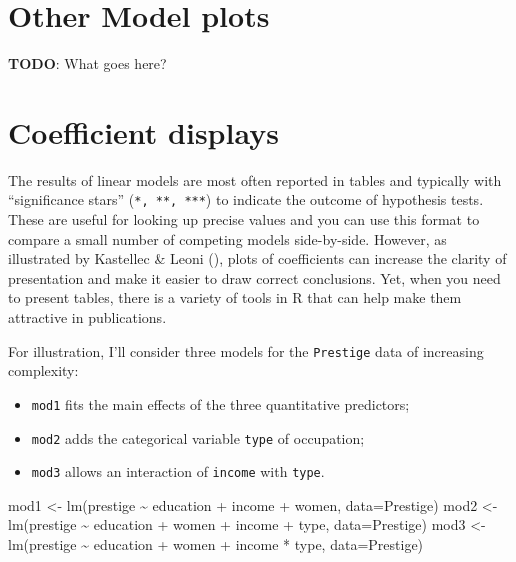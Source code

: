 \documentclass[
  letterpaper,
  10pt,
  krantz2]{krantz}
\makeatletter
\newenvironment{Shaded}{\begin{snugshade}}{\end{snugshade}}
\newcommand{\AttributeTok}[1]{\textcolor[rgb]{0.40,0.45,0.13}{#1}}
\newcommand{\FunctionTok}[1]{\textcolor[rgb]{0.28,0.35,0.67}{#1}}
\newcommand{\NormalTok}[1]{\textcolor[rgb]{0.00,0.23,0.31}{#1}}
\newcommand{\OtherTok}[1]{\textcolor[rgb]{0.00,0.23,0.31}{#1}}
\newcommand{\SpecialCharTok}[1]{\textcolor[rgb]{0.37,0.37,0.37}{#1}}
\providecommand{\tightlist}{%
  \setlength{\itemsep}{0pt}\setlength{\parskip}{0pt}}\usepackage{longtable,booktabs,array}
\newenvironment{kframe}{%
  \medskip{}
  \setlength{\fboxsep}{.8em}
  \def\at@end@of@kframe{}%
  \ifinner\ifhmode%
  \def\at@end@of@kframe{\end{minipage}}%
  \begin{minipage}{\columnwidth}%
  \fi\fi%
  \def\FrameCommand##1{\hskip\@totalleftmargin \hskip-\fboxsep
  \colorbox{shadecolor}{##1}\hskip-\fboxsep
      \hskip-\linewidth \hskip-\@totalleftmargin \hskip\columnwidth}%
  \MakeFramed {\advance\hsize-\width
    \@totalleftmargin\z@ \linewidth\hsize
    \@setminipage}}%
{\par\unskip\endMakeFramed%
  \at@end@of@kframe}
\renewenvironment{Shaded}{\begin{kframe}}{\end{kframe}}
\makeatother
\begin{document}
\section{Other Model plots}\label{other-model-plots}

\textbf{TODO}: What goes here?

\section{Coefficient displays}\label{coefficient-displays}

The results of linear models are most often reported in tables and
typically with ``significance stars'' (\texttt{*,\ **,\ ***}) to
indicate the outcome of hypothesis tests. These are useful for looking
up precise values and you can use this format to compare a small number
of competing models side-by-side. However, as illustrated by Kastellec
\& Leoni (), plots of
coefficients can increase the clarity of presentation and make it easier
to draw correct conclusions. Yet, when you need to present tables, there
is a variety of tools in R that can help make them attractive in
publications.

For illustration, I'll consider three models for the \texttt{Prestige}
data of increasing complexity:

\begin{itemize}
\tightlist
\item
  \texttt{mod1} fits the main effects of the three quantitative
  predictors;
\item
  \texttt{mod2} adds the categorical variable \texttt{type} of
  occupation;
\item
  \texttt{mod3} allows an interaction of \texttt{income} with
  \texttt{type}.
\end{itemize}

\begin{Shaded}
\begin{Highlighting}[]
\NormalTok{mod1 }\OtherTok{\textless{}{-}} \FunctionTok{lm}\NormalTok{(prestige }\SpecialCharTok{\textasciitilde{}}\NormalTok{ education }\SpecialCharTok{+}\NormalTok{ income }\SpecialCharTok{+}\NormalTok{ women,}
           \AttributeTok{data=}\NormalTok{Prestige)}
\NormalTok{mod2 }\OtherTok{\textless{}{-}} \FunctionTok{lm}\NormalTok{(prestige }\SpecialCharTok{\textasciitilde{}}\NormalTok{ education }\SpecialCharTok{+}\NormalTok{ women }\SpecialCharTok{+}\NormalTok{ income }\SpecialCharTok{+}\NormalTok{ type,}
           \AttributeTok{data=}\NormalTok{Prestige)}
\NormalTok{mod3 }\OtherTok{\textless{}{-}} \FunctionTok{lm}\NormalTok{(prestige }\SpecialCharTok{\textasciitilde{}}\NormalTok{ education }\SpecialCharTok{+}\NormalTok{ women }\SpecialCharTok{+}\NormalTok{ income }\SpecialCharTok{*}\NormalTok{ type,}
           \AttributeTok{data=}\NormalTok{Prestige)}
\end{Highlighting}
\end{Shaded}
\end{document}
